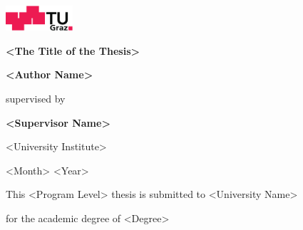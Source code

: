 
\begin{titlepage}
\begin{center}

\begin{sffamily}
\includegraphics[width=25mm]{images/TU_Graz_Logo}

\vfill

{\LARGE\bfseries
  <The Title of the Thesis>
}

\vfill

{\bfseries
  <Author Name>
}

supervised by

{\bfseries
  <Supervisor Name>
}

<University Institute>

<Month> <Year>


\vfill

This <Program Level> thesis is submitted to <University Name>

for the academic degree of <Degree>

\end{sffamily}
\end{center}
\end{titlepage}
\cleardoublepage

